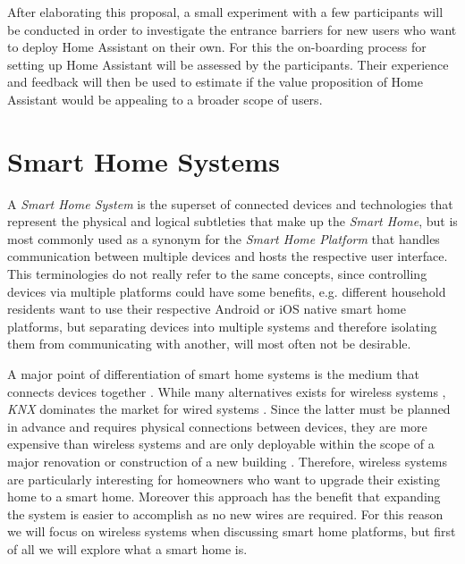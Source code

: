 After elaborating this proposal, a small experiment with a few participants will be conducted in order to investigate the entrance barriers for new users who want to deploy Home Assistant on their own. For this the on-boarding process for setting up  Home Assistant will be assessed by the participants. Their experience and feedback will then be used to estimate if the value proposition of Home Assistant would be appealing to a broader scope of users.

\newpage


\section{Smart Home Systems}
A \textit{Smart Home System} is the superset of connected devices and technologies that represent the physical and logical subtleties that make up the \textit{Smart Home}, but is most commonly used as a synonym for the \textit{Smart Home Platform} that handles communication between multiple devices and hosts the respective user interface.
This terminologies do not really refer to the same concepts, since controlling devices via multiple platforms could have some benefits, e.g. different household residents want to use their respective Android or iOS native smart home platforms, but separating devices into multiple systems and therefore isolating them from communicating with another, will most often not be desirable.

A major point of differentiation of smart home systems is the medium that connects devices together \cite{ReviewOfSmartHomes-6177682}. While many alternatives exists for wireless systems \cite{ReviewOfSmartHomes-6177682}, \textit{KNX} dominates the market for wired systems \cite{BertkoChris2017HSH:}. Since the latter must be planned in advance and requires physical connections between devices, they are more expensive than wireless systems and are only deployable within the scope of a major renovation or construction of a new building \cite{BertkoChris2017HSH:}. Therefore, wireless systems are particularly interesting for homeowners who want to upgrade their existing home to a smart home. Moreover this approach has the benefit that expanding the system is easier to accomplish as no new wires are required. For this reason we will focus on wireless systems when discussing smart home platforms, but first of all we will explore what a smart home is.

